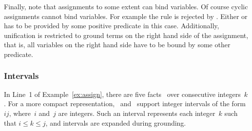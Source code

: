 Finally, note that assignments to some extent can bind variables.
Of course cyclic assignments cannot bind variables.
For example the rule  is rejected by \gringo{}.
Either  or  has to be provided by some positive predicate in this case.
Additionally, unification is restricted to ground terms on the right hand side of the assignment, 
that is, all variables on the right hand side have to be bound by some other predicate.

\subsubsection{Intervals}\label{subsec:gringo:interval}

In Line~1 of Example~\ref{ex:assign},
there are five facts~
over consecutive integers~$k$.
For a more compact representation,
\gringo\ and \clingo\ support integer intervals of the form $i$$j$,
where~$i$ and~$j$ are integers.
Such an interval represents each integer~$k$ such that $i\leq k\leq j$,
and intervals are expanded during grounding.


